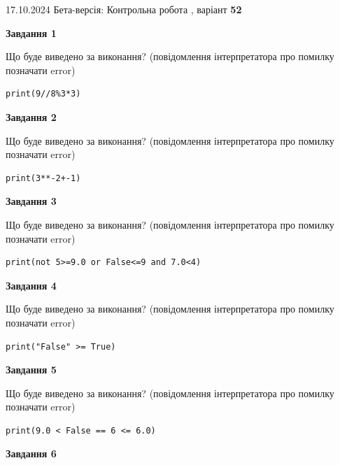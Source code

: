 \documentclass[12pt, ukrainian]{article}
\begin{document}
{\Large{17.10.2024 Бета-версія: Контрольна робота , варіант  \No \textbf { 52 }\par}}
{
\begin {large}
{\begin {center}\textbf{Завдання 1}\end {center}}

Що буде виведено за виконання? (повідомлення інтерпретатора про помилку позначати error)\par
\begin{verbatim}
print(9//8%3*3)
\end{verbatim}

{\begin {center}\textbf{Завдання 2}\end {center}}

Що буде виведено за виконання? (повідомлення інтерпретатора про помилку позначати error)\par
\begin{verbatim}
print(3**-2+-1)
\end{verbatim}

{\begin {center}\textbf{Завдання 3}\end {center}}

Що буде виведено за виконання? (повідомлення інтерпретатора про помилку позначати error)\par
\begin{verbatim}
print(not 5>=9.0 or False<=9 and 7.0<4)
\end{verbatim}

{\begin {center}\textbf{Завдання 4}\end {center}}

Що буде виведено за виконання? (повідомлення інтерпретатора про помилку позначати error)\par
\begin{verbatim}
print("False" >= True)
\end{verbatim}

{\begin {center}\textbf{Завдання 5}\end {center}}

Що буде виведено за виконання? (повідомлення інтерпретатора про помилку позначати error)\par
\begin{verbatim}
print(9.0 < False == 6 <= 6.0)
\end{verbatim}

{\begin {center}\textbf{Завдання 6}\end {center}}


\end{large}}
\end{document}
